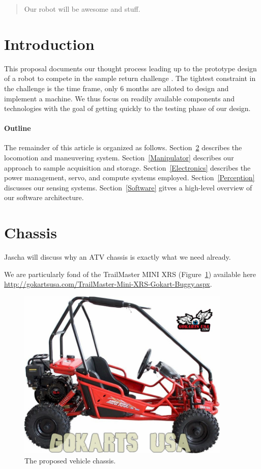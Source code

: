 \documentclass[12pt]{article}
\begin{document}
\maketitle

\begin{abstract}
Our robot will be awesome and stuff.
\end{abstract}

\section{Introduction}
This proposal documents our thought process leading up to the prototype design of a robot to compete in the sample return challenge \cite{rules}. The tightest constraint in the challenge is the time frame, only 6 months are alloted to design and implement a machine. We thus focus on readily available components and technologies with the goal of getting quickly to the testing phase of our design.

\paragraph{Outline}
The remainder of this article is organized as follows.
Section~\ref{Chassis} describes the locomotion and maneuvering system. Section~\ref{Manipulator} describes our approach to sample acquisition and storage. Section~\ref{Electronics} describes the power management, servo, and compute systems employed. Section~\ref{Perception} discusses our sensing systems. Section~\ref{Software} gitves a high-level overview of our software architecture.

\section{Chassis}\label{Chassis}
Jascha will discuss why an ATV chassis is exactly what we need already.

We are particularly fond of the TrailMaster MINI XRS (Figure~\ref{fig_gokart}) available here \url{http://gokartsusa.com/TrailMaster-Mini-XRS-Gokart-Buggy.aspx}.

\begin{figure}[htbp]
\centering
\includegraphics[width=4in]{TrailMasterMINIXRS.jpg}
\caption{The proposed vehicle chassis.}
\label{fig_gokart}
\end{figure}
\end{document}
